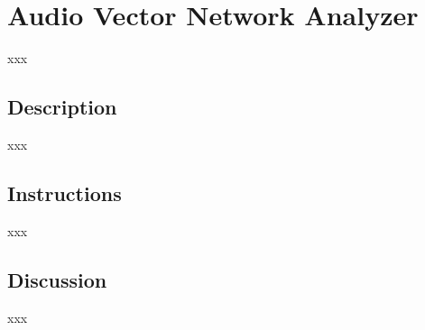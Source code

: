 \section{Audio Vector Network Analyzer}
xxx
\subsection{Description}
xxx
\subsection{Instructions}
xxx
\subsection{Discussion}
xxx
